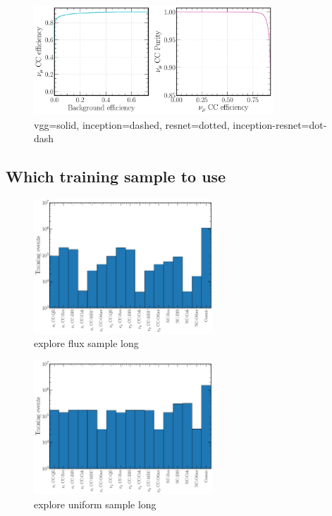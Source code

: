 \begin{figure} %
    \includegraphics[width=0.8\textwidth]{diagrams/7-cvn/chipsnet/arch_numu_comp_curves.pdf}
    \caption[arch numu comp curves short]
    {vgg=solid, inception=dashed, resnet=dotted, inception-resnet=dot-dash}
    \label{fig:arch_numu_comp_curves}
\end{figure}

\subsection{Which training sample to use} %
\label{sec:cvn_baseline_sample} %

\begin{figure} %
    \includegraphics[width=0.6\textwidth]{diagrams/7-cvn/chipsnet/explore_flux_sample.pdf}
    \caption[explore flux sample short]
    {explore flux sample long}
    \label{fig:explore_flux_sample}
\end{figure}

\begin{figure} %
    \includegraphics[width=0.6\textwidth]{diagrams/7-cvn/chipsnet/explore_uniform_sample.pdf}
    \caption[explore uniform sample short]
    {explore uniform sample long}
    \label{fig:explore_uniform_sample}
\end{figure}

